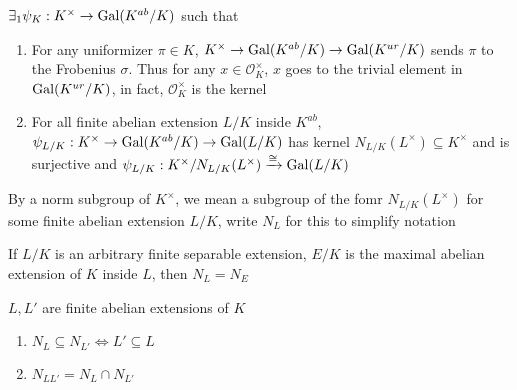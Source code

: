 \documentclass[main]{subfiles}
\begin{document}
\begin{theorem}
$\exists_1\psi_K:K^\times\to\operatorname{Gal}(K^{ab}/K)$ such that
\begin{enumerate}
\item For any uniformizer $\pi\in K$, $K^\times\to\operatorname{Gal}(K^{ab}/K)\to\operatorname{Gal}(K^{ur}/K)$ sends $\pi$ to the Frobenius $\sigma$. Thus for any $x\in\mathcal O_K^\times$, $x$ goes to the trivial element in $\operatorname{Gal}(K^{ur}/K)$, in fact, $\mathcal O_K^\times$ is the kernel
\item For all finite abelian extension $L/K$ inside $K^{ab}$, $\psi_{L/K}:K^\times\to\operatorname{Gal}(K^{ab}/K)\to\operatorname{Gal}(L/K)$ has kernel $N_{L/K}(L^\times)\subseteq K^\times$ and is surjective and $\psi_{L/K}:K^\times/N_{L/K}(L^\times)\xrightarrow\cong\operatorname{Gal}(L/K)$
\end{enumerate}
\begin{center}
\end{center}
\end{theorem}

\begin{definition}
By a norm subgroup of $K^\times$, we mean a subgroup of the fomr $N_{L/K}(L^\times)$ for some finite abelian extension $L/K$, write $N_L$ for this to simplify notation
\end{definition}

\begin{remark}
If $L/K$ is an arbitrary finite separable extension, $E/K$ is the maximal abelian extension of $K$ inside $L$, then $N_L=N_E$
\end{remark}

\begin{corollary}
$L,L'$ are finite abelian extensions of $K$
\begin{enumerate}
\item $N_L\subseteq N_{L'}\iff L'\subseteq L$
\item $N_{LL'}=N_L\cap N_{L'}$
\end{enumerate}
\begin{center}
\end{center}
\end{corollary}
\end{document}
